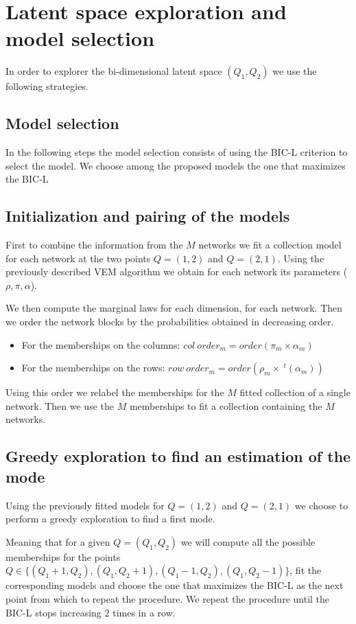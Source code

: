 \documentclass[12pt,a4paper]{report}
\begin{document}
\section{Latent space exploration and model selection}
In order to explorer the bi-dimensional latent space $(Q_1,Q_2)$
we use the following strategies.

\subsection{Model selection}
In the following steps the model selection consists of using the BIC-L 
criterion to select the model. We choose among the proposed models the one that
maximizes the BIC-L

\subsection{Initialization and pairing of the models}
First to combine the information from the $M$ networks we fit a collection model
for each network at the two points $Q = (1, 2)$ and $Q = (2, 1)$. Using the 
previously described VEM algorithm we obtain for each network its parameters 
($\rho,\pi,\alpha$).

We then compute the marginal laws for each dimension, for each network. Then 
we order the network blocks by the probabilities obtained in decreasing order.
\begin{itemize}
    \item For the memberships on the columns: 
    $col~order_m = order\left(\pi_m \times \alpha_m\right)$ 
    \item For the memberships on the rows:
    $row~order_m = order\left(\rho_m \times ~^{t}(\alpha_m)\right)$ 
\end{itemize}

Using this order we relabel the memberships for the $M$ fitted collection of a
single network.
Then we use the $M$ memberships to fit a collection containing the $M$ networks.
\subsection{Greedy exploration to find an estimation of the mode}
Using the previously fitted models for $Q = (1,2)$ and $Q = (2,1)$ we choose to
perform a greedy exploration to find a first mode.

Meaning that for a given $Q = (Q_1, Q_2)$ we will compute all the possible 
memberships for the points $Q \in \{(Q_1 + 1, Q_2),(Q_1, Q_2 + 1),(Q_1 - 1, Q_2),
(Q_1, Q_2 - 1)\}$, fit
the corresponding models and choose the one that maximizes the BIC-L as the 
next point from which to repeat the procedure. We repeat the procedure until the
BIC-L stops increasing $2$ times in a row.
\end{document}
